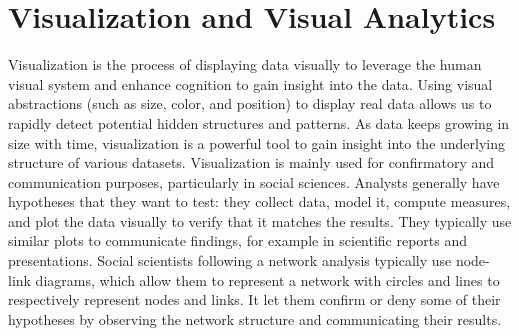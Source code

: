 %


\section{Visualization and Visual Analytics}

Visualization is the process of displaying data visually to leverage the human visual system and enhance cognition to gain insight into the data\cite{cardReadingsInformationVisualization1999}.
Using visual abstractions (such as size, color, and position) to display real data allows us to rapidly detect potential hidden structures and patterns.
As data keeps growing in size with time, visualization is a powerful tool to gain insight into the underlying structure of various datasets.
Visualization is mainly used for confirmatory and communication purposes, particularly in social sciences.
Analysts generally have hypotheses that they want to test: they collect data, model it, compute measures, and plot the data visually to verify that it matches the results.
They typically use similar plots to communicate findings, for example in scientific reports and presentations.
Social scientists following a network analysis typically use node-link diagrams, which allow them to represent a network with circles and lines to respectively represent nodes and links.
It let them confirm or deny some of their hypotheses by observing the network structure and communicating their results.

